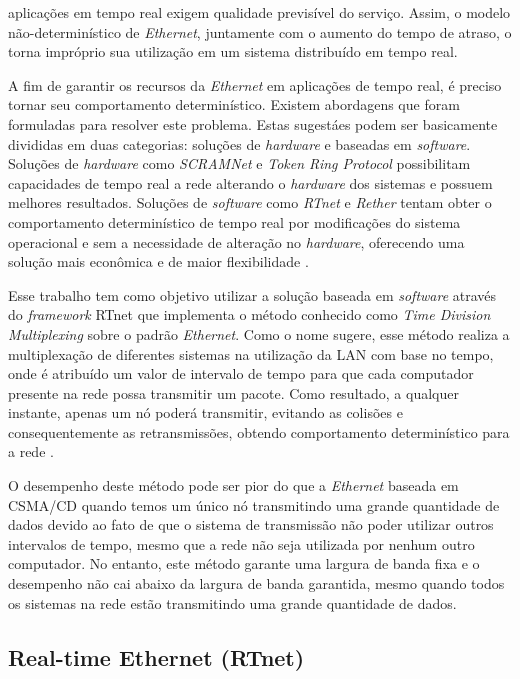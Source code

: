 \documentclass[conference]{IEEEtran}
\begin{document}
aplicações em tempo real exigem qualidade previsível do serviço. Assim, o modelo não-determinístico de \textit{Ethernet}, juntamente com o aumento do tempo de atraso, o torna impróprio sua utilização em um sistema distribuído em tempo real.

A fim de garantir os recursos da \textit{Ethernet} em aplicações de tempo real, é preciso tornar seu comportamento determinístico. Existem abordagens que foram formuladas para resolver este problema. Estas sugestáes podem ser basicamente divididas em duas categorias: soluções de \textit{hardware} e baseadas em \textit{software}. Soluções de \textit{hardware} como \textit{SCRAMNet} e \textit{Token Ring Protocol} possibilitam capacidades de tempo real a rede alterando o \textit{hardware} dos sistemas e possuem melhores resultados. Soluções de \textit{software} como \textit{RTnet} e \textit{Rether} tentam obter o comportamento determinístico de tempo real por modificações do sistema operacional e sem a necessidade de alteração no \textit{hardware}, oferecendo uma solução mais econômica e de maior flexibilidade \cite{Sampathkumar2002}. 	

Esse trabalho tem como objetivo utilizar a solução baseada em \textit{software} através do \textit{framework} RTnet que implementa o método conhecido como \textit{Time Division Multiplexing} sobre o padrão \textit{Ethernet}. Como o nome sugere, esse método realiza a multiplexação de diferentes sistemas na utilização da LAN com base no tempo, onde é atribuído um valor de intervalo de tempo para que cada computador presente na rede possa transmitir um pacote. Como resultado, a qualquer instante, apenas um nó poderá transmitir, evitando as colisões e consequentemente as retransmissões, obtendo comportamento determinístico para a rede \cite{rt_net_IEEE_so53551}.  

O desempenho deste método pode ser pior do que a \textit{Ethernet} baseada em CSMA/CD quando temos um único nó transmitindo uma grande quantidade de dados devido ao fato de que o sistema de transmissão não poder utilizar outros intervalos de tempo, mesmo que a rede não seja utilizada por nenhum outro computador. No entanto, este método garante uma largura de banda fixa e o desempenho não cai abaixo da largura de banda garantida, mesmo quando todos os sistemas na rede estão transmitindo uma grande quantidade de dados.

\subsection{Real-time Ethernet (RTnet)}\label{subsec:rtnet}
\end{document}
